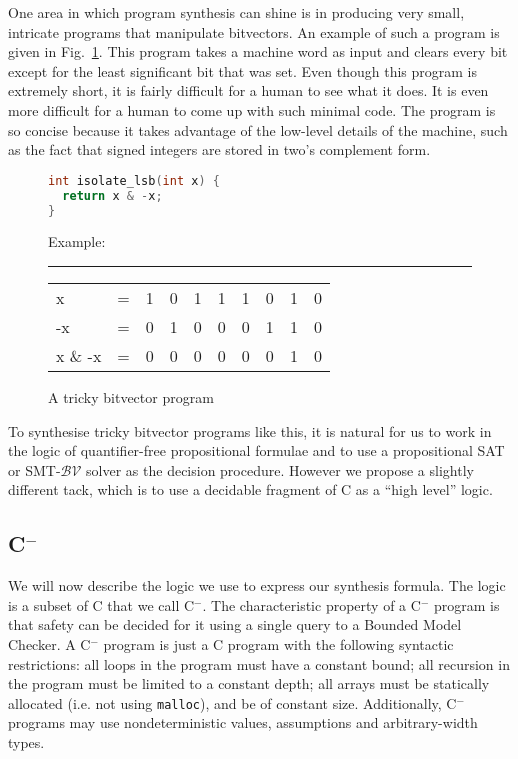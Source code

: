 \documentclass[a4paper]{llncs}
\newcommand{\newC}{C$^-$\xspace}
\begin{document}
One area in which program synthesis can shine is in producing very small,
intricate programs that manipulate bitvectors.  An example of such a program
is given in Fig.~\ref{fig:bitvector-program}.  This program takes a machine word
as input and clears every bit except for the least significant bit that was set.
Even though this program is extremely short, it is fairly difficult for a human
to see what it does.  It is even more difficult for a human to come up with such
minimal code.  The program is so concise because it
takes advantage of the low-level details of the machine, such as the fact that
signed integers are stored in two's complement form.

\begin{figure}
\centering
\begin{minipage}{0.45\linewidth}
 \begin{lstlisting}[language=C]
int isolate_lsb(int x) {
  return x & -x;
}
 \end{lstlisting}
\end{minipage}
\begin{minipage}{0.45\linewidth}
 
Example:

\hrule

\begin{tabular}{llcccccccc}
 x       & = & 1 & 0 & 1 & 1 & 1 & 0 & 1 & 0 \\
 -x      & = & 0 & 1 & 0 & 0 & 0 & 1 & 1 & 0 \\
 x \& -x & = & 0 & 0 & 0 & 0 & 0 & 0 & 1 & 0
\end{tabular}
\end{minipage}


 \caption{A tricky bitvector program}
  \label{fig:bitvector-program}
\end{figure}


To synthesise tricky bitvector programs like this, it is natural for us to
work in the logic of quantifier-free propositional formulae and to use a
propositional SAT or SMT-$\mathcal{BV}$ solver as the decision procedure. 
However we propose a slightly different tack, which is to use a decidable
fragment of C as a ``high level'' logic.


\subsection{\newC}
\label{sec:logic}

We will now describe the logic we use to express our synthesis formula.
The logic is a subset of C that we call \newC.  The characteristic property of a
\newC  program is that safety can be decided for
it using a single query to a Bounded Model Checker.  A \newC program is
just a C program with the following syntactic restrictions:
 all loops in the program must have a constant bound;
 all recursion in the program must be limited to a constant depth;
 all arrays must be statically allocated (i.e. not using \texttt{malloc}),
 and be of constant size.
Additionally, \newC programs may use nondeterministic values, assumptions
and arbitrary-width types.
\end{document}

